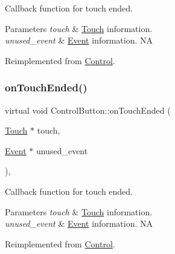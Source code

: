 Callback function for touch ended.


\begin{DoxyParams}{Parameters}
{\em touch} & \hyperlink{classTouch}{Touch} information. \\
\hline
{\em unused\+\_\+event} & \hyperlink{classEvent}{Event} information.  NA \\
\hline
\end{DoxyParams}


Reimplemented from \hyperlink{classControl_a56073e57060169fe80cbb6ce1f4abe28}{Control}.

\mbox{\label{classControlButton_a7597744c683964152429472a358b3fd2}} 
\subsubsection{\texorpdfstring{on\+Touch\+Ended()}{onTouchEnded()}\hspace{0.1cm}{\footnotesize\ttfamily [2/2]}}
{\footnotesize\ttfamily virtual void Control\+Button\+::on\+Touch\+Ended (\begin{DoxyParamCaption}\item[{\hyperlink{classTouch}{Touch} $\ast$}]{touch,  }\item[{\hyperlink{classEvent}{Event} $\ast$}]{unused\+\_\+event }\end{DoxyParamCaption})\hspace{0.3cm}{\ttfamily [override]}, {\ttfamily [virtual]}}

Callback function for touch ended.


\begin{DoxyParams}{Parameters}
{\em touch} & \hyperlink{classTouch}{Touch} information. \\
\hline
{\em unused\+\_\+event} & \hyperlink{classEvent}{Event} information.  NA \\
\hline
\end{DoxyParams}


Reimplemented from \hyperlink{classControl_a56073e57060169fe80cbb6ce1f4abe28}{Control}.

\mbox{\label{classControlButton_aacecc916b91af98f4f9a2550d678bd44}} 
